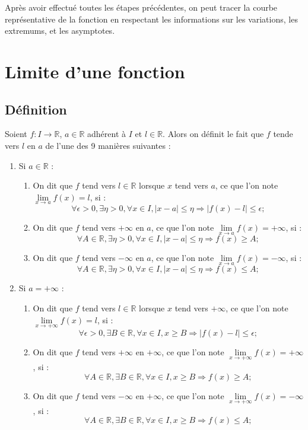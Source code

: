 \documentclass{article}
\begin{document}
	Après avoir effectué toutes les étapes précédentes, on peut tracer la courbe représentative de la fonction en respectant les informations sur les variations, les extremums, et les asymptotes.
	
	
	\section{Limite d’une fonction}
	\subsection{Définition}
		Soient $f : I \to \mathbb{R}$, $a \in \mathbb{R}$ adhérent à $I$ et $l \in \mathbb{R}$. Alors on définit le fait que $f$ tende vers $l$ en $a$ de l’une des 9 manières suivantes :
		\begin{enumerate}
			\item Si $a \in \mathbb{R}$ :
			\begin{enumerate}
				\item On dit que $f$ tend vers $l \in \mathbb{R}$ lorsque $x$ tend vers $a$, ce que l’on note $\lim\limits_{x \to a} f(x) = l$, si :
				\[
				\forall \epsilon > 0, \exists \eta > 0, \forall x \in I, |x - a| \leq \eta \Rightarrow |f(x) - l| \leq \epsilon;
				\]
				\item On dit que $f$ tend vers $+\infty$ en $a$, ce que l’on note $\lim\limits_{x \to a} f(x) = +\infty$, si :
				\[
				\forall A \in \mathbb{R}, \exists \eta > 0, \forall x \in I, |x - a| \leq \eta \Rightarrow f(x) \geq A;
				\]
				\item On dit que $f$ tend vers $-\infty$ en $a$, ce que l’on note $\lim\limits_{x \to a} f(x) = -\infty$, si :
				\[
				\forall A \in \mathbb{R}, \exists \eta > 0, \forall x \in I, |x - a| \leq \eta \Rightarrow f(x) \leq A;
				\]
			\end{enumerate}
			
			\item Si $a = +\infty$ :
			\begin{enumerate}
				\item On dit que $f$ tend vers $l \in \mathbb{R}$ lorsque $x$ tend vers $+\infty$, ce que l’on note $\lim\limits_{x \to +\infty} f(x) = l$, si :
				\[
				\forall \epsilon > 0, \exists B \in \mathbb{R}, \forall x \in I, x \geq B \Rightarrow |f(x) - l| \leq \epsilon;
				\]
				\item On dit que $f$ tend vers $+\infty$ en $+\infty$, ce que l’on note $\lim\limits_{x \to +\infty} f(x) = +\infty$, si :
				\[
				\forall A \in \mathbb{R}, \exists B \in \mathbb{R}, \forall x \in I, x \geq B \Rightarrow f(x) \geq A;
				\]
				\item On dit que $f$ tend vers $-\infty$ en $+\infty$, ce que l’on note $\lim\limits_{x \to +\infty} f(x) = -\infty$, si :
				\[
				\forall A \in \mathbb{R}, \exists B \in \mathbb{R}, \forall x \in I, x \geq B \Rightarrow f(x) \leq A;
				\]
			\end{enumerate}
			

\end{enumerate}
\end{document}
